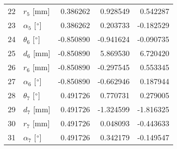 \documentclass{standalone}%
\begin{document}
\begin{tabular}{llrrr}
22 &              $r_{5}$ [mm] &  0.386262 &   0.928549 &   0.542287 \\
23 &  $\alpha_{5}$ [$\degree$] &  0.386262 &   0.203733 &  -0.182529 \\
24 &  $\theta_{6}$ [$\degree$] & -0.850890 &  -0.941624 &  -0.090735 \\
25 &              $d_{6}$ [mm] & -0.850890 &   5.869530 &   6.720420 \\
26 &              $r_{6}$ [mm] & -0.850890 &  -0.297545 &   0.553345 \\
27 &  $\alpha_{6}$ [$\degree$] & -0.850890 &  -0.662946 &   0.187944 \\
28 &  $\theta_{7}$ [$\degree$] &  0.491726 &   0.770731 &   0.279005 \\
29 &              $d_{7}$ [mm] &  0.491726 &  -1.324599 &  -1.816325 \\
30 &              $r_{7}$ [mm] &  0.491726 &   0.048093 &  -0.443633 \\
31 &  $\alpha_{7}$ [$\degree$] &  0.491726 &   0.342179 &  -0.149547 \\
\bottomrule
\end{tabular}
%
\end{document}
